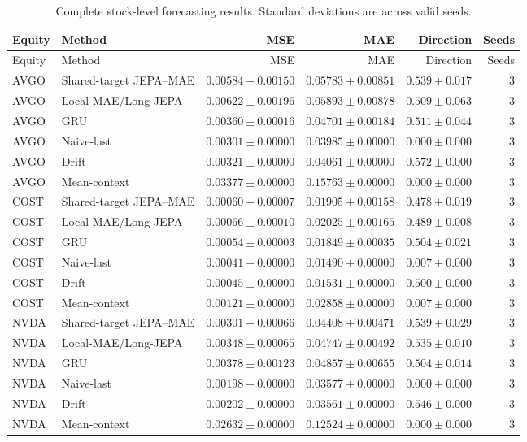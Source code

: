 \begin{longtable}{llrrrr}
\caption{Complete stock-level forecasting results. Standard deviations are across valid seeds.}\label{tab:appendix_stock_metrics}\\
\toprule
Equity & Method & MSE & MAE & Direction & Seeds \\
\midrule
\endfirsthead
\toprule
Equity & Method & MSE & MAE & Direction & Seeds \\
\midrule
\endhead
AVGO & Shared-target JEPA--MAE & $0.00584 \pm 0.00150$ & $0.05783 \pm 0.00851$ & $0.539 \pm 0.017$ & 3 \\
AVGO & Local-MAE/Long-JEPA & $0.00622 \pm 0.00196$ & $0.05893 \pm 0.00878$ & $0.509 \pm 0.063$ & 3 \\
AVGO & GRU & $0.00360 \pm 0.00016$ & $0.04701 \pm 0.00184$ & $0.511 \pm 0.044$ & 3 \\
AVGO & Naive-last & $0.00301 \pm 0.00000$ & $0.03985 \pm 0.00000$ & $0.000 \pm 0.000$ & 3 \\
AVGO & Drift & $0.00321 \pm 0.00000$ & $0.04061 \pm 0.00000$ & $0.572 \pm 0.000$ & 3 \\
AVGO & Mean-context & $0.03377 \pm 0.00000$ & $0.15763 \pm 0.00000$ & $0.000 \pm 0.000$ & 3 \\
COST & Shared-target JEPA--MAE & $0.00060 \pm 0.00007$ & $0.01905 \pm 0.00158$ & $0.478 \pm 0.019$ & 3 \\
COST & Local-MAE/Long-JEPA & $0.00066 \pm 0.00010$ & $0.02025 \pm 0.00165$ & $0.489 \pm 0.008$ & 3 \\
COST & GRU & $0.00054 \pm 0.00003$ & $0.01849 \pm 0.00035$ & $0.504 \pm 0.021$ & 3 \\
COST & Naive-last & $0.00041 \pm 0.00000$ & $0.01490 \pm 0.00000$ & $0.007 \pm 0.000$ & 3 \\
COST & Drift & $0.00045 \pm 0.00000$ & $0.01531 \pm 0.00000$ & $0.500 \pm 0.000$ & 3 \\
COST & Mean-context & $0.00121 \pm 0.00000$ & $0.02858 \pm 0.00000$ & $0.007 \pm 0.000$ & 3 \\
NVDA & Shared-target JEPA--MAE & $0.00301 \pm 0.00066$ & $0.04408 \pm 0.00471$ & $0.539 \pm 0.029$ & 3 \\
NVDA & Local-MAE/Long-JEPA & $0.00348 \pm 0.00065$ & $0.04747 \pm 0.00492$ & $0.535 \pm 0.010$ & 3 \\
NVDA & GRU & $0.00378 \pm 0.00123$ & $0.04857 \pm 0.00655$ & $0.504 \pm 0.014$ & 3 \\
NVDA & Naive-last & $0.00198 \pm 0.00000$ & $0.03577 \pm 0.00000$ & $0.000 \pm 0.000$ & 3 \\
NVDA & Drift & $0.00202 \pm 0.00000$ & $0.03561 \pm 0.00000$ & $0.546 \pm 0.000$ & 3 \\
NVDA & Mean-context & $0.02632 \pm 0.00000$ & $0.12524 \pm 0.00000$ & $0.000 \pm 0.000$ & 3 \\
\bottomrule
\end{longtable}
